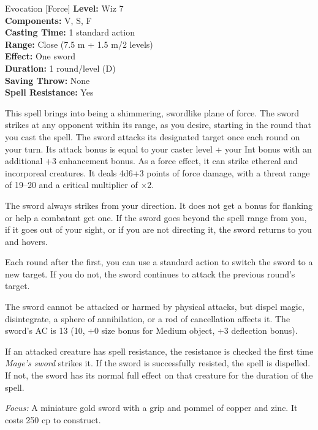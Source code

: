 {Evocation [Force]}
{
	\textbf{Level:}
	Wiz 7\\
	\textbf{Components:}
	V, S, F\\
	\textbf{Casting Time:}
	1 standard action\\
	\textbf{Range:}
	Close (7.5 m + 1.5 m/2 levels)\\
	\textbf{Effect:}
	One sword\\
	\textbf{Duration:}
	1 round/level (D)\\
	\textbf{Saving Throw:}
	None\\
	\textbf{Spell Resistance:}
	Yes\\
}
{
	This spell brings into being a shimmering, swordlike plane of force. The sword strikes at any opponent within its range, as you desire, starting in the round that you cast the spell. The sword attacks its designated target once each round on your turn. Its attack bonus is equal to your caster level + your Int bonus with an additional +3 enhancement bonus. As a force effect, it can strike ethereal and incorporeal creatures. It deals 4d6+3 points of force damage, with a threat range of 19--20 and a critical multiplier of $\times$2.

	The sword always strikes from your direction. It does not get a bonus for flanking or help a combatant get one. If the sword goes beyond the spell range from you, if it goes out of your sight, or if you are not directing it, the sword returns to you and hovers.

	Each round after the first, you can use a standard action to switch the sword to a new target. If you do not, the sword continues to attack the previous round's target.

	The sword cannot be attacked or harmed by physical attacks, but dispel magic, disintegrate, a sphere of annihilation, or a rod of cancellation affects it. The sword's AC is 13 (10, +0 size bonus for Medium object, +3 deflection bonus).

	If an attacked creature has spell resistance, the resistance is checked the first time \emph{Mage's sword} strikes it. If the sword is successfully resisted, the spell is dispelled. If not, the sword has its normal full effect on that creature for the duration of the spell.

	\textit{Focus:}
	A miniature gold sword with a grip and pommel of copper and zinc. It costs 250 cp to construct.

}
